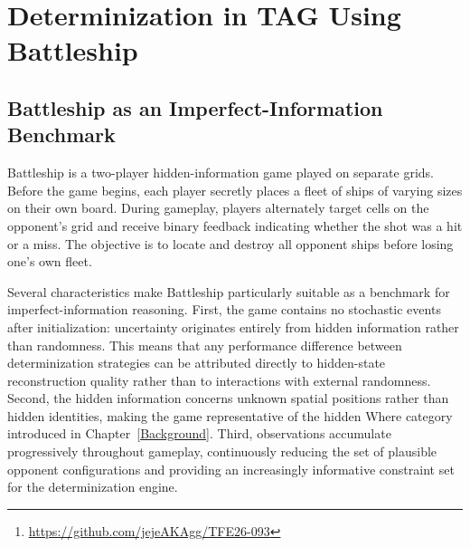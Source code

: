 \chapter{Determinization in TAG Using Battleship}
\label{BattleshipInTAG}

\begin{abstract}
This chapter presents the TAG-based benchmark developed to study determinization quality in imperfect-information environments. Battleship is used as the reference case study because it provides a simple but representative hidden-position problem in which agents must reason about unknown spatial configurations using only partial observations.

The objective is not merely to implement Battleship in TAG, but to investigate how different determinization strategies influence the behavior and performance of simulation-based agents under uncertainty. Three strategies are introduced and compared: a naive random baseline, a constraint-based approach consistent with accumulated observations, and a heatmap-guided extension that biases simulations toward statistically plausible ship placements.

The full implementation is available on \hyperlink{https://github.com/jejeAKAgg/TFE26-093}{GitHub}\footnote{\url{https://github.com/jejeAKAgg/TFE26-093}}, which includes the \LaTeX{} source for this thesis alongside the TAG and Ludii implementations as Git submodules.
\end{abstract}


\section{Battleship as an Imperfect-Information Benchmark}
\label{sec:battleship_benchmark}

Battleship is a two-player hidden-information game played on separate grids. Before the game begins, each player secretly places a fleet of ships of varying sizes on their own board. During gameplay, players alternately target cells on the opponent's grid and receive binary feedback indicating whether the shot was a hit or a miss. The objective is to locate and destroy all opponent ships before losing one's own fleet.

Several characteristics make Battleship particularly suitable as a benchmark for imperfect-information reasoning. First, the game contains no stochastic events after initialization: uncertainty originates entirely from hidden information rather than randomness. This means that any performance difference between determinization strategies can be attributed directly to hidden-state reconstruction quality rather than to interactions with external randomness. Second, the hidden information concerns unknown spatial positions rather than hidden identities, making the game representative of the hidden Where category introduced in Chapter~\ref{Background}. Third, observations accumulate progressively throughout gameplay, continuously reducing the set of plausible opponent configurations and providing an increasingly informative constraint set for the determinization engine.

